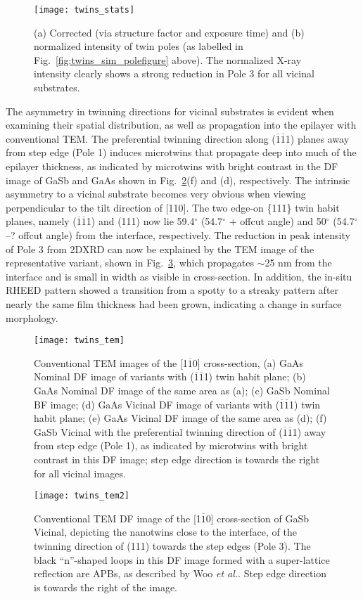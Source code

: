 \begin{figure}
    \centering
    \texttt{[image: twins\_stats]}
    \caption{\label{fig:twins_stats}(a) Corrected (via structure factor and exposure time) and (b) normalized intensity of twin poles (as labelled in Fig.~\ref{fig:twins_sim_polefigure} above). The normalized X-ray intensity clearly shows a strong reduction in Pole 3 for all vicinal substrates.}	
\end{figure}
The asymmetry in twinning directions for vicinal substrates is evident when examining their spatial distribution, as well as propagation into the epilayer with conventional TEM. The preferential twinning direction along ($\overline{1}\overline{1}$1) planes away from step edge (Pole 1) induces microtwins that propagate deep into much of the epilayer thickness, as indicated by microtwins with bright contrast in the DF image of GaSb and GaAs shown in Fig.~\ref{fig:twins_tem}(f) and (d), respectively. The intrinsic asymmetry to a vicinal substrate becomes very obvious when viewing perpendicular to the tilt direction of [110]. The two edge-on \{111\} twin habit planes, namely ($\overline{1}\overline{1}$1) and (111) now lie 59.4$^\circ$ (54.7$^\circ$ $+$ offcut angle) and 50$^\circ$ (54.7$^\circ$ --? offcut angle) from the interface, respectively. The reduction in peak intensity of Pole 3 from 2DXRD can now be explained by the TEM image of the representative variant, shown in Fig.~\ref{fig:twins_tem2}, which propagates $\sim$25 nm from the interface and is small in width as visible in cross-section. In addition, the in-situ RHEED pattern showed a transition from a spotty to a streaky pattern after nearly the same film thickness had been grown, indicating a change in surface morphology.
\begin{figure}
    \centering
    \texttt{[image: twins\_tem]}
    \caption{\label{fig:twins_tem}Conventional TEM images of the [1$\overline{1}$0] cross-section, (a) GaAs Nominal DF image of variants with ($\overline{1}\overline{1}$1) twin habit plane; (b) GaAs Nominal DF image of the same area as (a); (c) GaSb Nominal BF image; (d) GaAs Vicinal DF image of variants with ($\overline{1}\overline{1}$1) twin habit plane; (e) GaAs Vicinal DF image of the same area as (d); (f) GaSb Vicinal with the preferential twinning direction of ($\overline{1}\overline{1}$1) away from step edge (Pole 1), as indicated by microtwins with bright contrast in this DF image; step edge direction is towards the right for all vicinal images.}	
\end{figure}
\begin{figure}
    \centering
    \texttt{[image: twins\_tem2]}
    \caption{\label{fig:twins_tem2}Conventional TEM DF image of the [1$\overline{1}$0] cross-section of GaSb Vicinal, depicting the nanotwins close to the interface, of the twinning direction of (111) towards the step edges (Pole 3). The black ``n''-shaped loops in this DF image formed with a super-lattice reflection are APBs, as described by Woo \textit{et al.}\cite{Woo}. Step edge direction is towards the right of the image.}	
\end{figure}
